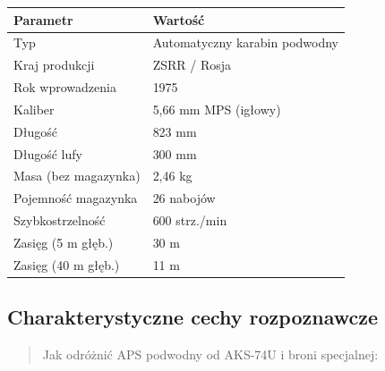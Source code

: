\documentclass[12pt,oneside]{book}
\begin{document}
\begin{longtable}[]{@{}ll@{}}
\toprule\noalign{}
Parametr & Wartość \\
\midrule\noalign{}
\endhead
\bottomrule\noalign{}
\endlastfoot
Typ & Automatyczny karabin podwodny \\
Kraj produkcji & ZSRR / Rosja \\
Rok wprowadzenia & 1975 \\
Kaliber & 5,66 mm MPS (igłowy) \\
Długość & 823 mm \\
Długość lufy & 300 mm \\
Masa (bez magazynka) & 2,46 kg \\
Pojemność magazynka & 26 nabojów \\
Szybkostrzelność & 600 strz./min \\
Zasięg (5 m głęb.) & 30 m \\
Zasięg (40 m głęb.) & 11 m \\
\end{longtable}

\subsection{Charakterystyczne cechy
rozpoznawcze}\label{charakterystyczne-cechy-rozpoznawcze-115}

\begin{quote}
Jak odróżnić APS podwodny od AKS-74U i broni specjalnej:
\end{quote}
\end{document}
